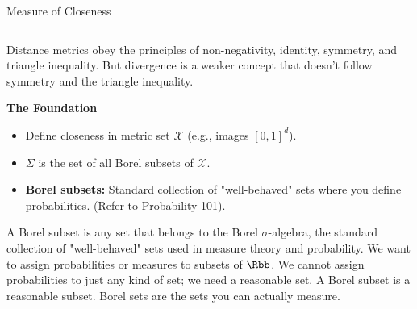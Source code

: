 \documentclass[aspectratio=169,xcolor=dvipsnames,svgnames,x11names,fleqn]{beamer}
\begin{document}
\begin{frame}{Measure of Closeness}
    \begin{columns}[T]
        \begin{column}{0.48\textwidth}
            \begin{tcolorbox}[
                enhanced,
                colback=WGANBlue!5, 
                colframe=WGANBlue,
                title=\footnotesize Metrics vs. Divergence,
                fonttitle=\bfseries,
                boxrule=0.5pt,
                arc=2pt
            ]
            \scriptsize
            Distance metrics obey the principles of non-negativity, identity, symmetry, and triangle inequality. But divergence is a weaker concept that doesn't follow symmetry and the triangle inequality.
            \end{tcolorbox}

            \textbf{\footnotesize The Foundation}
            \begin{itemize}
                \tiny
                \item Define closeness in metric set $\mathcal{X}$ (e.g., images $[0, 1]^d$).
                \item $\Sigma$ is the set of all Borel subsets of $\mathcal{X}$.
                \item \textbf{Borel subsets:} Standard collection of "well-behaved" sets where you define probabilities. (Refer to Probability 101).

            \end{itemize}

            \begin{center}

                       \begin{tcolorbox}[blanker, left=5pt, borderline west={1.5pt}{0pt}{WGANOrange}]
                \tiny
            A Borel subset is any set that belongs to the Borel $\sigma$-algebra, the standard collection of "well-behaved" sets used in measure theory and probability.  We want to assign probabilities or measures to subsets of $\Rbb$. We cannot assign probabilities to just any kind of set; we need a reasonable set. A Borel subset is a reasonable subset. Borel sets are the sets you can actually measure.
                        \end{tcolorbox}
            \end{center}
        \end{column}


\end{columns}
\end{frame}
\end{document}
